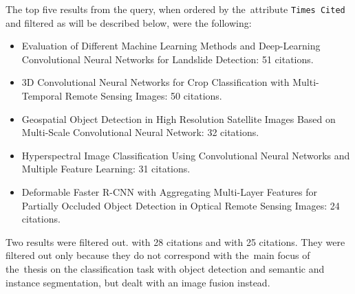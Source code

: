 \noindent The top five results from the query, when ordered by the~attribute \verb|Times Cited| and filtered as will be described below, were the following:

\begin{itemize}
	\item Evaluation of Different Machine Learning Methods and Deep-Learning Convolutional Neural Networks for Landslide Detection: 51 citations. \cite{landslide-evaluation}
	\item 3D Convolutional Neural Networks for Crop Classification with Multi-Temporal Remote Sensing Images: 50 citations. \cite{3d-cnn-crop}
	\item Geospatial Object Detection in High Resolution Satellite Images Based on Multi-Scale Convolutional Neural Network: 32 citations. \cite{object-detection-hrs-multi-scale}
	\item Hyperspectral Image Classification Using Convolutional Neural Networks and Multiple Feature Learning: 31 citations. \cite{hyperspectral-multiple-feat-cnn}
	\item Deformable Faster R-CNN with Aggregating Multi-Layer Features for Partially Occluded Object Detection in Optical Remote Sensing Images: 24 citations. \cite{deformable-faster-r-cnn}
\end{itemize}

Two results were filtered out. \cite{cnn-fusion-clouds} with 28 citations and \cite{cnn-fusion-hr-hsr} with 25 citations. They were filtered out only because they do not correspond with the~main focus of the~thesis on the classification task with object detection and semantic and instance segmentation, but dealt with an image fusion instead. 

